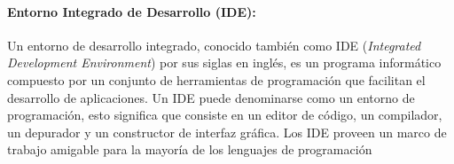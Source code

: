 \paragraph{Entorno Integrado de Desarrollo (IDE):} Un entorno de desarrollo integrado, conocido también como IDE (\emph{Integrated Development
Environment}) por sus siglas en inglés, es un programa informático compuesto por un conjunto de herramientas de programación que facilitan el desarrollo de aplicaciones. Un IDE
puede denominarse como un entorno de programación, esto significa que consiste en un
editor de código, un compilador, un depurador y un constructor de interfaz gráfica. Los
IDE proveen un marco de trabajo amigable para la mayoría de los lenguajes de programación
